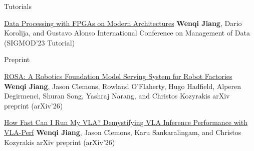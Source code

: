 \begin{rSection}{Tutorials}

\begin{enumerate}[label={[\arabic*]}]

\item
\begin{Pub}{\href{https://dl.acm.org/doi/pdf/10.1145/3555041.3589410?casa_token=VwR_uiM-hLgAAAAA:sDCBaEV-PwKO07yGNkngnVlxywHnp61rkL4M7aFE8FlIC5RXgoBkAWR9zV-pYHiOdRchNpOOHIi2zAE}{Data Processing with FPGAs on Modern Architectures}}
{\textbf{Wenqi Jiang}, Dario Korolija, and Gustavo Alonso}
{International Conference on Management of Data (SIGMOD'23 Tutorial)}
\end{Pub}\end{enumerate}
\end{rSection}



\begin{rSection}{Preprint}
\begin{enumerate}[label={[\arabic*]}]

\item
\begin{Pub}{\href{https://arxiv.org/abs/2607.01088}{ROSA: A Robotics Foundation Model Serving System for Robot Factories}}
{\textbf{Wenqi Jiang}, Jason Clemons, Rowland O'Flaherty, Hugo Hadfield, Alperen Degirmenci, Shuran Song, Yashraj Narang, and Christos Kozyrakis}
{arXiv preprint (arXiv'26)}
\end{Pub}

\item
\begin{Pub}{\href{https://arxiv.org/abs/2602.18397}{How Fast Can I Run My VLA? Demystifying VLA Inference Performance with VLA-Perf}}
{\textbf{Wenqi Jiang}, Jason Clemons, Karu Sankaralingam, and Christos Kozyrakis}
{arXiv preprint (arXiv'26)}
\end{Pub}\end{enumerate}
\end{rSection}
